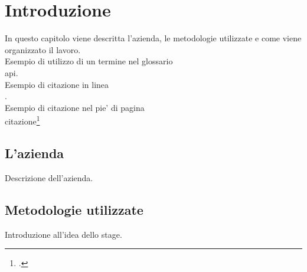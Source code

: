 
\chapter{Introduzione}
\label{cap:introduzione}

In questo capitolo viene descritta l'azienda, le metodologie utilizzate e come viene organizzato il lavoro.\\

\noindent Esempio di utilizzo di un termine nel glossario \\
\gls{api}. \\

\noindent Esempio di citazione in linea \\
\cite{site:agile-manifesto}. \\

\noindent Esempio di citazione nel pie' di pagina \\
citazione\footcite{womak:lean-thinking} \\

\section{L'azienda}

Descrizione dell'azienda.

\section{Metodologie utilizzate}

Introduzione all'idea dello stage.


